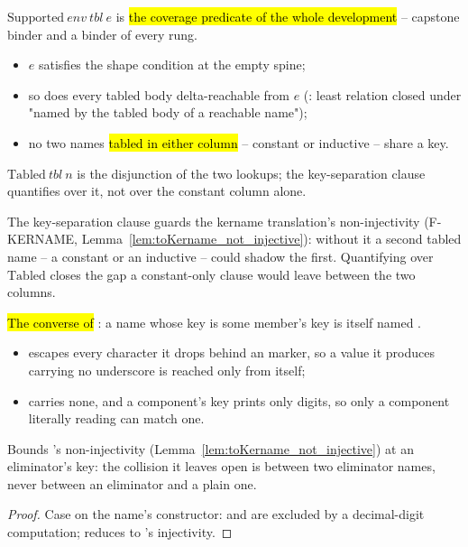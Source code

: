 \begin{definition}
\label{def:Supported}
\leanok
{}
 $\mathrm{Supported}\ env\ tbl\ e$ is \hl{the coverage predicate of the whole
development} -- capstone binder  and a binder of every rung.
\begin{itemize}
\item $e$ satisfies the shape condition at the empty spine;
\item so does every tabled body delta-reachable from $e$ (: least relation closed
under "named by the tabled body of a reachable name");
\item no two names \hl{tabled in either column} -- constant or inductive -- share a \lbox{} key.
\end{itemize}
 $\mathrm{Tabled}\ tbl\ n$ is the disjunction of the two lookups; the key-separation
clause quantifies over it, not over the constant column alone.
\end{definition}

\begin{remark}
 The key-separation clause guards the kername translation's non-injectivity
(F-KERNAME, Lemma~\ref{lem:toKername_not_injective}): without it a second tabled name -- a
constant or an inductive -- could shadow the first. Quantifying over $\mathrm{Tabled}$ closes the
gap a constant-only clause would leave between the two columns.
\end{remark}

\begin{lemma}
\label{lem:toKername_of_cleanIdent_casesOn}
\leanok
{}
 \hl{The converse of }: a name whose \lbox{}
key is some member's  key is itself named .
\begin{itemize}
\item {} escapes every character it drops behind an  marker, so a value
it produces carrying no underscore is reached only from itself;
\item {} carries none, and a  component's key prints only digits, so only
a  component literally reading  can match one.
\end{itemize}
 Bounds 's non-injectivity (Lemma~\ref{lem:toKername_not_injective}) at
an eliminator's key: the collision it leaves open is between two eliminator names, never between
an eliminator and a plain one.
\end{lemma}
\begin{proof}
\leanok
{}
 Case on the name's constructor:  and  are excluded by a
decimal-digit computation;  reduces to 's injectivity.
\end{proof}

